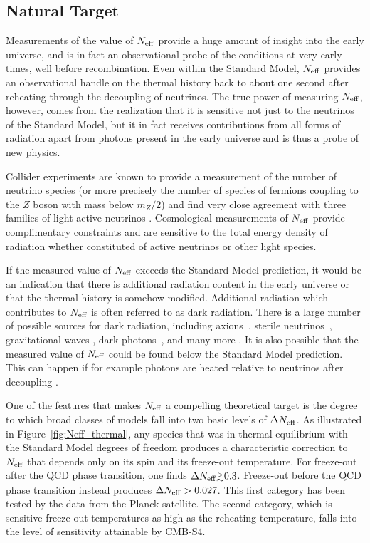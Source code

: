 \subsection{Natural Target}

Measurements of the value of $N_{\rm eff}$ provide a huge amount of insight into the early universe, and is in fact an observational probe of the conditions at very early times, well before recombination.  Even within the Standard Model, $N_{\rm eff}$ provides an observational handle on the thermal history back to about one second after reheating through the decoupling of neutrinos.  The true power of measuring $N_{\rm eff}$, however, comes from the realization that it is sensitive not just to the neutrinos of the Standard Model, but it in fact receives contributions from all forms of radiation apart from photons present in the early universe and is thus a probe of new physics.

Collider experiments are known to provide a measurement of the number of neutrino species (or more precisely the number of species of fermions coupling to the $Z$ boson with mass below $m_Z/2$) and find very close agreement with three families of light active neutrinos \cite{ALEPH:2005ab}.  Cosmological measurements of $N_{\rm eff}$ provide complimentary constraints and are sensitive to the total energy density of radiation whether constituted of active neutrinos or other light species.

If the measured value of $N_{\rm eff}$ exceeds the Standard Model prediction, it would be an indication that there is additional radiation content in the early universe or that the thermal history is somehow modified.  Additional radiation which contributes to $N_{\rm eff}$ is often referred to as dark radiation.  There is a large number of possible sources for dark radiation, including axions~\cite{Brust:2013xpv,Salvio:2013iaa,Kawasaki:2015ofa,Baumann:2016wac}, sterile neutrinos~\cite{Abazajian:2001nj,Strumia:2006db,Boyarsky:2009ix}, gravitational waves \cite{Boyle:2007zx,Stewart:2007fu,Meerburg:2015zua}, dark photons~\cite{Ackerman:2008gi,Kaplan:2011yj,CyrRacine:2012fz}, and many more \cite{Cadamuro:2010cz,Weinberg:2013kea}.  It is also possible that the measured value of $N_{\rm eff}$ could be found below the Standard Model prediction.  This can happen if for example photons are heated relative to neutrinos after decoupling \cite{Steigman:2013yua,Boehm:2013jpa}.

One of the features that makes $N_{\rm eff}$ a compelling theoretical target is the degree to which broad classes of models fall into two basic levels of $\Delta N_{\rm eff}$.  As illustrated in Figure~\ref{fig:Neff_thermal}, any species that was in thermal equilibrium with the Standard Model degrees of freedom produces a characteristic correction to $N_{\rm eff}$ that depends only on its spin and its freeze-out temperature.  For freeze-out after the QCD phase transition, one finds $\Delta \Neff \gtrsim 0.3$.  Freeze-out before the QCD phase transition instead produces $\Delta N_{\rm eff} > 0.027$.  This first category has been tested by the data from the Planck satellite.  The second category, which is sensitive freeze-out temperatures as high as the reheating temperature, falls into the level of sensitivity attainable by CMB-S4.

